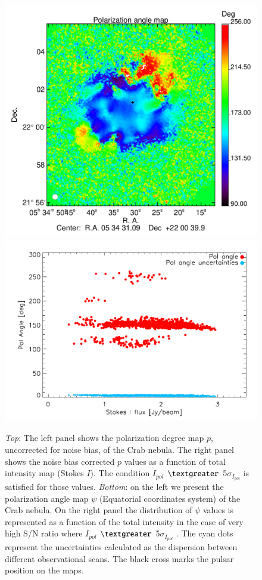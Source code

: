 \documentclass[twocolumn,traditabstract]{aa}
\begin{document}
\begin{figure}
\includegraphics[clip, angle=0, scale = 0.35]{figures/Crab_angle2_2mm.pdf}
\includegraphics[clip, angle=0, scale = 0.5]{figures/pol_angle_vs_I_2mm.pdf}
\caption{{\it Top}: The left panel shows the polarization
  degree map $p$, uncorrected for noise bias, of the Crab nebula. The right panel shows the noise bias
  corrected $p$ values as a function of total intensity map (Stokes $I$). The
  condition $I_{pol}$ $\textgreater$ 5$\sigma_{I_{pol}}$ is satisfied for those values. {\it
    Bottom}: on the left we present the polarization angle map $\psi$ (Equatorial coordinates system) of the
  Crab nebula. On the right panel the distribution of $\psi$ values is
  represented as a function of the total intensity in the case of very high S/N ratio where $I_{pol}$ $\textgreater$ 5$\sigma_{I_{pol}}$ . The cyan dots represent the uncertainties calculated as the
  dispersion between different observational scans. The black cross marks the pulsar position on the maps.}
\label{fig:pol_degree}
\end{figure}
\end{document}
